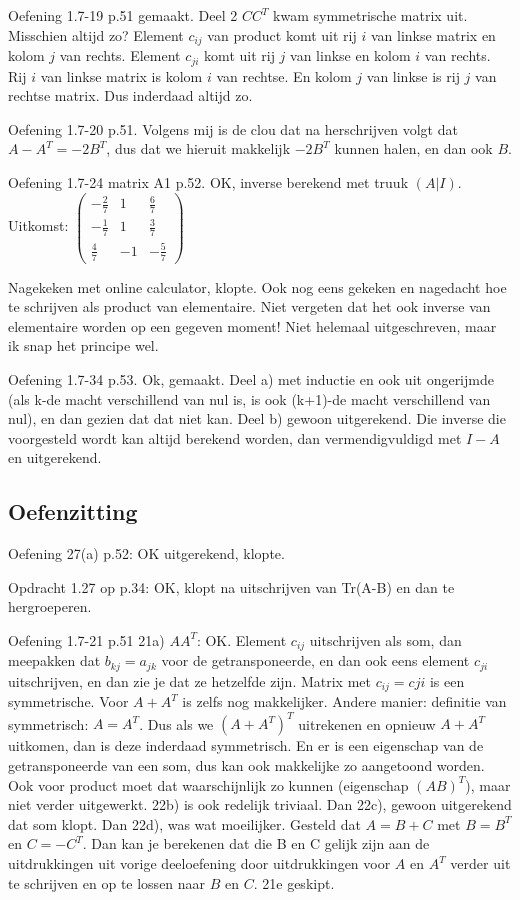 \documentclass{article}
\begin{document}
Oefening 1.7-19 p.51 gemaakt. Deel 2 $C C^T$ kwam symmetrische matrix uit. Misschien altijd zo? Element $c_{ij}$ van product komt uit rij $i$ van linkse matrix en kolom $j$ van rechts. Element $c_{ji}$ komt uit rij $j$ van linkse en kolom $i$ van rechts. Rij $i$ van linkse matrix is kolom $i$ van rechtse. En kolom $j$ van linkse is rij $j$ van rechtse matrix. Dus inderdaad altijd zo. 


Oefening 1.7-20 p.51. Volgens mij is de clou dat na herschrijven volgt dat $A-A^T = -2B^T$, dus dat we hieruit makkelijk $-2B^T$ kunnen halen, en dan ook $B$. 

Oefening 1.7-24 matrix A1 p.52. OK, inverse berekend met truuk $(A|I)$. Uitkomst: 
\begin{math}
\begin{pmatrix}
-\frac{2}{7} & 1 & \frac{6}{7}\\
-\frac{1}{7} & 1 & \frac{3}{7} \\
\frac{4}{7} & -1 & -\frac{5}{7} 
\end{pmatrix}
\end{math}

Nagekeken met online calculator, klopte. Ook nog eens gekeken en nagedacht hoe te schrijven als product van elementaire. Niet vergeten dat het ook inverse van elementaire worden op een gegeven moment! Niet helemaal uitgeschreven, maar ik snap het principe wel. 

Oefening 1.7-34 p.53. Ok, gemaakt. Deel a) met inductie en ook uit ongerijmde (als k-de macht verschillend van nul is, is ook (k+1)-de macht verschillend van nul), en dan gezien dat dat niet kan. Deel b) gewoon uitgerekend. Die inverse die voorgesteld wordt kan altijd berekend worden, dan vermendigvuldigd met $I-A$ en uitgerekend.


\subsection{Oefenzitting}

Oefening 27(a) p.52: OK uitgerekend, klopte. 

Opdracht 1.27 op p.34: OK, klopt na uitschrijven van Tr(A-B) en dan te hergroeperen. 

Oefening 1.7-21 p.51
21a) $AA^T$: OK. Element $c_{ij}$ uitschrijven als som, dan meepakken dat $b_{kj} = a_{jk}$ voor de getransponeerde, en dan ook eens element $c_{ji}$ uitschrijven, en dan zie je dat ze hetzelfde zijn. Matrix met $c_{ij} = c{ji}$ is een symmetrische. Voor $A+A^T$ is zelfs nog makkelijker. 
Andere manier: definitie van symmetrisch: $A=A^T$. Dus als we $(A+A^T)^T$ uitrekenen en opnieuw $A+A^T$ uitkomen, dan is deze inderdaad symmetrisch. En er is een eigenschap van de getransponeerde van een som, dus kan ook makkelijke zo aangetoond worden. Ook voor product moet dat waarschijnlijk zo kunnen (eigenschap $(AB)^T$), maar niet verder uitgewerkt. 
22b) is ook redelijk triviaal. Dan 22c), gewoon uitgerekend dat som klopt. Dan 22d), was wat moeilijker. Gesteld dat $A=B+C$ met $B=B^T$ en  $C=-C^T$. Dan kan je berekenen dat die B en C gelijk zijn aan de uitdrukkingen uit vorige deeloefening door uitdrukkingen voor $A$ en $A^T$ verder uit te schrijven en op te lossen naar $B$ en $C$. 
21e geskipt. 
\end{document}

